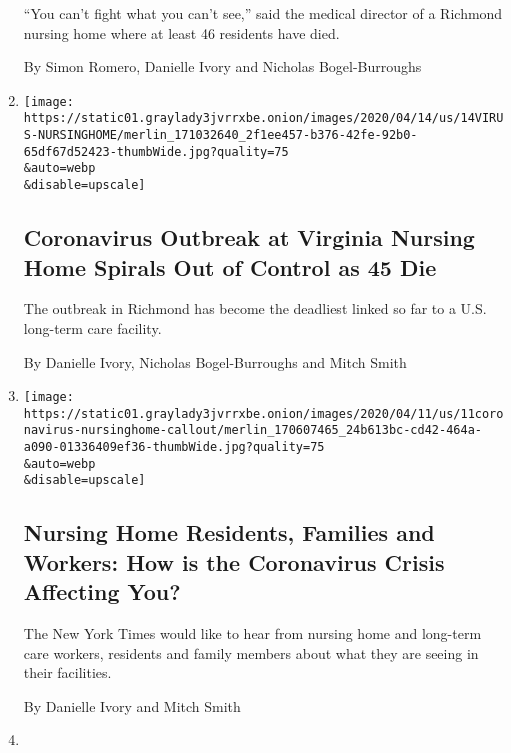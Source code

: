 \begin{enumerate}
  ``You can't fight what you can't see,'' said the medical director of a
  Richmond nursing home where at least 46 residents have died.

  By Simon Romero, Danielle Ivory and Nicholas Bogel-Burroughs
\item
  \href{/2020/04/14/us/coronavirus-nursing-homes.html}{}

  \texttt{[image: https://static01.graylady3jvrrxbe.onion/images/2020/04/14/us/14VIRUS-NURSINGHOME/merlin\_171032640\_2f1ee457-b376-42fe-92b0-65df67d52423-thumbWide.jpg?quality=75\\\&auto=webp\\\&disable=upscale]}

  \hypertarget{coronavirus-outbreak-at-virginia-nursing-home-spirals-out-of-control-as-45-die}{%
  \subsection{Coronavirus Outbreak at Virginia Nursing Home Spirals Out
  of Control as 45
  Die}\label{coronavirus-outbreak-at-virginia-nursing-home-spirals-out-of-control-as-45-die}}

  The outbreak in Richmond has become the deadliest linked so far to a
  U.S. long-term care facility.

  By Danielle Ivory, Nicholas Bogel-Burroughs and Mitch Smith
\item
  \href{/2020/04/11/business/nursing-home-callout.html}{}

  \texttt{[image: https://static01.graylady3jvrrxbe.onion/images/2020/04/11/us/11coronavirus-nursinghome-callout/merlin\_170607465\_24b613bc-cd42-464a-a090-01336409ef36-thumbWide.jpg?quality=75\\\&auto=webp\\\&disable=upscale]}

  \hypertarget{nursing-home-residents-families-and-workers-how-is-the-coronavirus-crisis-affecting-you}{%
  \subsection{Nursing Home Residents, Families and Workers: How is the
  Coronavirus Crisis Affecting
  You?}\label{nursing-home-residents-families-and-workers-how-is-the-coronavirus-crisis-affecting-you}}

  The New York Times would like to hear from nursing home and long-term
  care workers, residents and family members about what they are seeing
  in their facilities.

  By Danielle Ivory and Mitch Smith
\item
  \href{/2020/04/08/us/coronavirus-cook-county-jail-chicago.html}{}


\end{enumerate}
